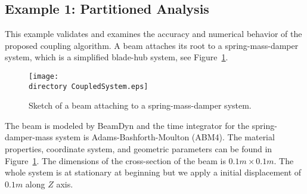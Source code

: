 \documentclass{aiaa-tc}
\def\directory{EPSF/}
\begin{document}
 \subsection{Example 1: Partitioned Analysis}
 This example validates and examines the accuracy and numerical behavior of the proposed coupling algorithm. A beam attaches its root to a spring-mass-damper system, which is a simplified blade-hub system, see Figure~\ref{fig:CoupledSystem}. 
 \begin{figure}
\centering
\texttt{[image: \\directory CoupledSystem.eps]}
\caption{Sketch of a beam attaching to a spring-mass-damper system.} 
\label{fig:CoupledSystem}
\end{figure}
 The beam is modeled by BeamDyn and the time integrator for the spring-damper-mass system is Adams-Bashforth-Moulton (ABM4). The material properties, coordinate system, and geometric parameters can be found in Figure~\ref{fig:CoupledSystem}. The dimensions of the cross-section of the beam is $0.1m \times 0.1m$. The whole system is at stationary at beginning but we apply a initial displacement of $0.1m$ along $Z$ axis. 
 
\end{document}
